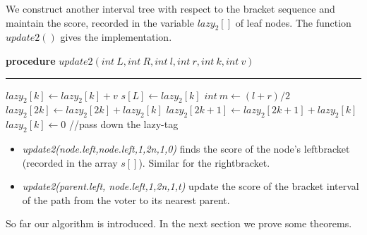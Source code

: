 We construct another interval tree with respect to the bracket sequence  and maintain the score, recorded in the variable $lazy_2[]$ of leaf nodes. The function $update2()$ gives the implementation.
\begin{algorithm}
	\textbf{procedure} $update2(int~L,int ~R, int~l, int~r, int~k, int~v)$
	\hrule
	{
       $lazy_2[k] \leftarrow lazy_2[k]+v$\;
       {
       	   $s[L]\leftarrow lazy_2[k]$
       }
	}
	{
		$int~m \leftarrow (l+r)/2$\;
		$lazy_2[2k] \leftarrow lazy_2[2k]+lazy_2[k]$\;
		$lazy_2[2k+1]\leftarrow lazy_2[2k+1]+lazy_2[k]$\;
		$lazy_2[k] \leftarrow 0$
			{\color{gray}
		//pass down the lazy-tag}\;
    }
\end{algorithm}
\begin{itemize}
	\item {\em update2(node.left,node.left,1,2n,1,0)} finds the score of the node's leftbracket (recorded in the array $s[]$). Similar for the rightbracket. 
	\item {\em update2(parent.left, node.left,1,2n,1,t)} update the score of the bracket interval of the path from the voter to its nearest parent.
\end{itemize}
So far our algorithm is introduced. In the next section we prove some theorems.